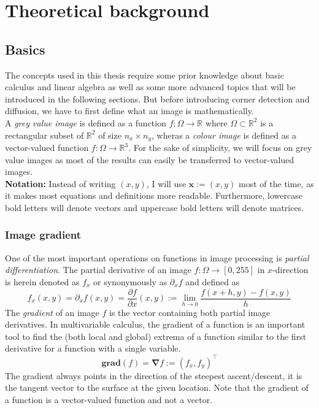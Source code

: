 \newcommand{\TODO}[1]{\ \\ \textbf{\textcolor{red}{!! #1 !!}}\\}
\chapter{Theoretical background}\label{ch:Theory}
\section{Basics}\label{sec:Basics}
The concepts used in this thesis require some prior knowledge about basic calculus and linear
algebra as well as some more advanced topics that will be introduced in the following sections.
But before introducing corner detection and diffusion, we have to first define what an image is
mathematically.\\
A \textit{grey value image} is defined as a function $f: \Omega \rightarrow \mathbb{R}$ where
$\Omega \subset \mathbb{R}^2$ is a rectangular subset of $\mathbb{R}^2$ of size $n_x\times n_y$,
wheras a
\textit{colour image} is defined as a vector-valued function $f: \Omega \rightarrow \mathbb{R}^3$.
For the sake of simplicity, we will focus on grey value images as most of the results can easily be
transferred to vector-valued images.\\
\textbf{Notation:} Instead of writing $(x, y)$, I will use $\boldsymbol x := (x, y)$ most of the
time, as it makes most equations and definitions more readable. Furthermore, lowercase bold letters will denote vectors and uppercase bold letters will
denote matrices.
\subsection{Image gradient}
One of the most important operations on functions in image processing is \textit{partial
    differentiation}.
The partial derivative of an image $f: \Omega \rightarrow [0, 255]$ in $x$-direction is herein denoted as $f_x$ or
synonymously as $\partial_x f$ and defined as
\begin{equation}
    f_x(x, y) = \partial_x f (x, y) = \frac{\partial f}{\partial x} (x, y) := \lim_{h \to 0}\frac{f(x+h, y) -f(x, y)}{h} 
\end{equation}
The \textit{gradient} of an image $f$ is the vector containing both partial image derivatives.
In multivariable calculus, the gradient of a function is an important tool to find the (both local
and global) extrema of a function similar to the first derivative for a function with a single
variable.
\begin{equation}
    \textbf{grad}(f) = \boldsymbol\nabla f := \left(f_x, f_y\right)^\top
\end{equation}
The gradient always points in the direction of the steepest ascent/descent, it is the tangent
vector to the surface at the given location\cite{mfi3}.
Note that the gradient of a function is a vector-valued function and not a vector.

